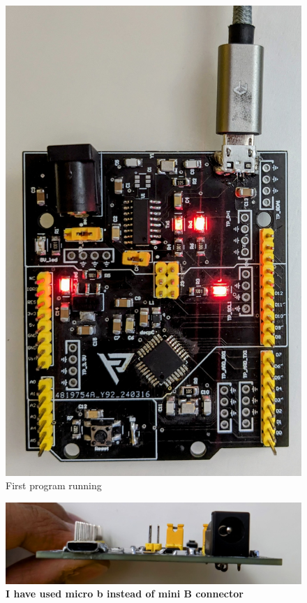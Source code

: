 \documentclass[a4paper,11pt]{article}%
\begin{document}
\begin{figure}[H]
	\centering
	\includegraphics[scale=0.2]{figures/working_board.jpg}
	\caption{First program running}
\end{figure}


\begin{figure}[H]
	\centering
	\includegraphics[scale=0.35]{figures/usb.jpg}
	\caption{\textbf{I have used micro b instead of mini B connector}}
\end{figure}
\end{document}
